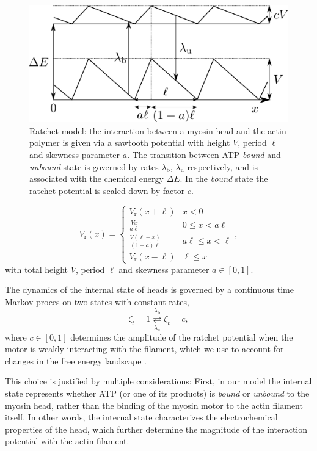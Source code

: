 \documentclass[aps,pre,twocolumn,showpacs,showkeys,superscriptaddress,floatfix]{revtex4-1}
\begin{document}
\begin{figure}[t]
\centering
\includegraphics[width=0.9\linewidth,height=!]{energy}
\caption{
\label{fig:energy}
Ratchet model: the interaction between a myosin head and the actin polymer is given via a sawtooth potential with height $V$, period $\ell$ and skewness parameter $a$.
The transition between ATP \emph{bound} and \emph{unbound} state is governed by rates $\lambda_\text{b}$, $\lambda_\text{u}$ respectively, 
and is associated with the chemical energy $\Delta E$.
In the \emph{bound} state the ratchet potential is scaled down by factor $c$. 
}
\end{figure}
\begin{equation}
V_\text{r}(x) =  \begin{cases}
        V_\text{r}(x+\ell) & x < 0 \\[1ex] 
        \displaystyle \frac{ V x }{ a \ell } & 0 \leq x < a \ell \\[2ex]
        \displaystyle \frac{ V (\ell-x) }{ (1-a) \ell } & a \ell \leq x < \ell \\[2ex]
        V_\text{r}(x-\ell) & \ell \leq x  
   \end{cases} ,
   \label{eq:ratchet_potential}
\end{equation}
with total height $V$,
period $\ell$ 
and skewness parameter $a \in [0,1]$. 

The dynamics of the internal state of heads is governed by a continuous time Markov proces on two states with constant rates,
\begin{equation}
\zeta_t = 1 \overset{\lambda_\text{b}}{\underset{\lambda_\text{u}}{\rightleftarrows}} \zeta_t = c ,
\label{eq:transition}
\end{equation}
where $c\in\left[0,1\right]$ determines the amplitude of the ratchet potential when the motor is weakly interacting with the filament, 
which we use to account for changes in the free energy landscape \cite{Nie2014,nie2014conformational}.

This choice is justified by multiple considerations: 
First, in our model the internal state represents whether ATP (or one of its products) is \emph{bound} or \emph{unbound} to the myosin head,
rather than the binding of the myosin motor to the actin filament itself.
In other words, the internal state characterizes the electrochemical properties of the head, 
which further determine the magnitude of the interaction potential with the actin filament.
\end{document}
